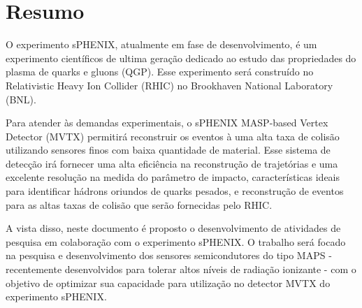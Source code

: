 \chapter*{Resumo}

O experimento sPHENIX, atualmente em fase de desenvolvimento, é um experimento científicos de ultima geração dedicado ao estudo das propriedades do plasma de quarks e gluons (QGP). Esse experimento será construído no Relativistic Heavy Ion Collider (RHIC) no Brookhaven National Laboratory (BNL). 

Para atender às demandas experimentais, o sPHENIX  MASP-based Vertex Detector (MVTX) permitirá reconstruir os eventos à uma alta taxa de colisão utilizando sensores finos com baixa quantidade de material. Esse sistema de detecção irá fornecer uma alta eficiência na reconstrução de trajetórias e uma excelente resolução na medida do parâmetro de impacto, características ideais para identificar hádrons oriundos de quarks pesados, e reconstrução de eventos para as altas taxas de colisão que serão fornecidas pelo RHIC.

A vista disso, neste documento é proposto o desenvolvimento de atividades de pesquisa em colaboração com o experimento sPHENIX. O trabalho será focado na pesquisa e desenvolvimento dos sensores semicondutores do tipo MAPS - recentemente desenvolvidos para tolerar altos níveis de radiação ionizante - com o objetivo de optimizar sua capacidade para utilização no detector MVTX do experimento sPHENIX.

